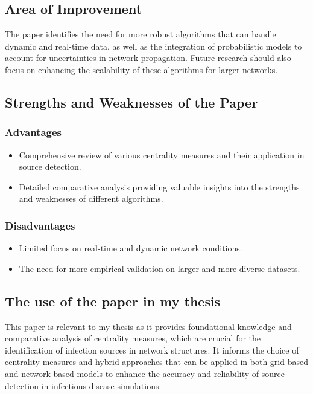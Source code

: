 \subsection{Area of Improvement}

The paper identifies the need for more robust algorithms that can handle dynamic and real-time data, as well as the integration of probabilistic models to account for uncertainties in network propagation. Future research should also focus on enhancing the scalability of these algorithms for larger networks.

\subsection{Strengths and Weaknesses of the Paper}

\subsubsection{Advantages}

\begin{itemize}
    \item Comprehensive review of various centrality measures and their application in source detection.
    \item Detailed comparative analysis providing valuable insights into the strengths and weaknesses of different algorithms.
\end{itemize}

\subsubsection{Disadvantages}

\begin{itemize}
    \item Limited focus on real-time and dynamic network conditions.
    \item The need for more empirical validation on larger and more diverse datasets.
\end{itemize}

\subsection{The use of the paper in my thesis}

This paper is relevant to my thesis as it provides foundational knowledge and comparative analysis of centrality measures, which are crucial for the identification of infection sources in network structures. It informs the choice of centrality measures and hybrid approaches that can be applied in both grid-based and network-based models to enhance the accuracy and reliability of source detection in infectious disease simulations.

